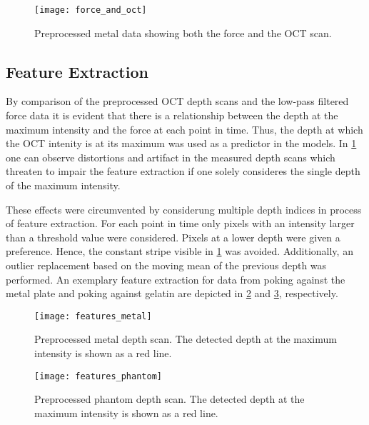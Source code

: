 \begin{figure}
    \centering
    \texttt{[image: force\_and\_oct]}
    \caption{Preprocessed metal data showing both the force and the OCT scan.}
    \label{fig:force_and_oct}
\end{figure}

\subsection{Feature Extraction}\label{subsec:feature_extraction}

By comparison of the preprocessed OCT depth scans and the low-pass filtered force data it is evident that there is a relationship between the depth at the maximum intensity and the force at each point in time.
Thus, the depth at which the OCT intenity is at its maximum was used as a predictor in the models.
In \cref{fig:force_and_oct} one can observe distortions and artifact in the measured depth scans which threaten to impair the feature extraction if one solely consideres the single depth of the maximum intensity.

These effects were circumvented by considerung multiple depth indices in process of feature extraction.
For each point in time only pixels with an intensity larger than a threshold value were considered.
Pixels at a lower depth were given a preference.
Hence, the constant stripe visible in \cref{fig:force_and_oct} was avoided.
Additionally, an outlier replacement based on the moving mean of the previous depth was performed.
An exemplary feature extraction for data from poking against the metal plate and poking against gelatin are depicted in \cref{fig:features_metal} and \cref{fig:features_phantom}, respectively.

\begin{figure}
    \centering
    \texttt{[image: features\_metal]}
    \caption{Preprocessed metal depth scan. The detected depth at the maximum intensity is shown as a red line.}
    \label{fig:features_metal}
\end{figure}

\begin{figure}
    \centering
    \texttt{[image: features\_phantom]}
    \caption{Preprocessed phantom depth scan. The detected depth at the maximum intensity is shown as a red line.}
    \label{fig:features_phantom}
\end{figure}

